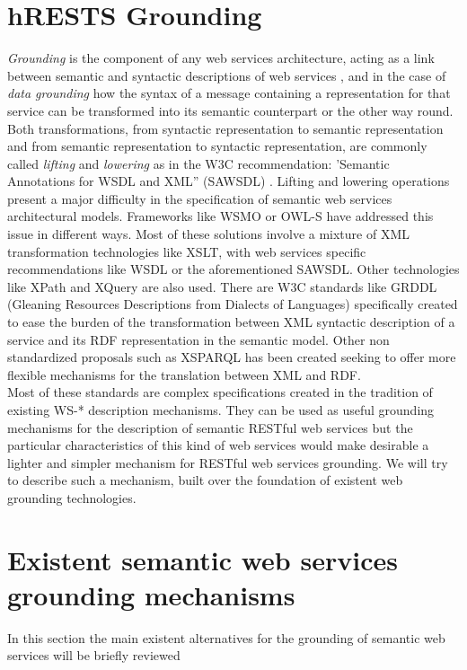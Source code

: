 \section{hRESTS Grounding}
\emph{Grounding} is the component of any web services architecture, acting as a link between semantic and syntactic descriptions of web services \cite{ISBN:3540345191}, and in the case of \emph{data grounding} how the syntax of a message containing  a representation for that service can be transformed into its semantic counterpart or the other way round.\\
Both transformations, from syntactic representation to semantic representation and from semantic representation to syntactic representation, are commonly called \emph{lifting} and \emph{lowering} as in the W3C recommendation: 'Semantic Annotations for WSDL and XML'' (SAWSDL)  \cite{Lausen:07:SAW}. Lifting and lowering operations present a major difficulty in the specification of semantic web services architectural models. Frameworks like WSMO \cite{wsmo} or OWL-S  \cite{owls} have addressed this issue in different ways. Most of these solutions involve a mixture of XML transformation technologies like XSLT, with web services specific recommendations like WSDL \cite{w3cwsdl} or the aforementioned SAWSDL. Other technologies like XPath \cite{xpath} and XQuery \cite{xquery} are also used. There are  W3C standards like GRDDL (Gleaning Resources Descriptions from Dialects of Languages) \cite{Connolly:07:GRD} specifically created to ease the burden of the transformation between XML syntactic description of a service and its RDF representation in the semantic model. Other non standardized proposals such as XSPARQL \cite{xsparql} has been created seeking to offer more flexible mechanisms for the translation between XML and RDF.\\
Most of these standards are complex specifications created in the tradition of existing WS-* description mechanisms. They can be used as useful grounding mechanisms for the description of semantic RESTful web services but the particular characteristics of this kind of web services would make desirable a lighter and simpler mechanism for RESTful web services grounding. We will try to describe such a mechanism, built over the foundation of existent web grounding technologies.\\

\section{Existent semantic web services grounding mechanisms}
In this section the main existent alternatives for the grounding of semantic web services will be briefly reviewed

